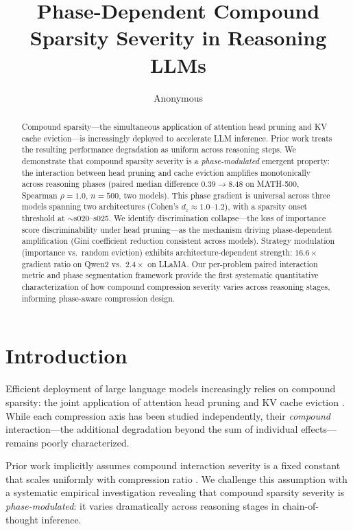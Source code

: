 \documentclass[11pt,a4paper]{article}
\title{Phase-Dependent Compound Sparsity Severity in Reasoning LLMs}
\author{Anonymous}
\begin{document}
\maketitle

\begin{abstract}
Compound sparsity---the simultaneous application of attention head pruning and KV cache eviction---is increasingly deployed to accelerate LLM inference. Prior work treats the resulting performance degradation as uniform across reasoning steps. We demonstrate that compound sparsity severity is a \emph{phase-modulated} emergent property: the interaction between head pruning and cache eviction amplifies monotonically across reasoning phases (paired median difference $0.39 \rightarrow 8.48$ on MATH-500, Spearman $\rho = 1.0$, $n = 500$, two models). This phase gradient is universal across three models spanning two architectures (Cohen's $d_z \approx 1.0$--$1.2$), with a sparsity onset threshold at $\sim$s020--s025. We identify discrimination collapse---the loss of importance score discriminability under head pruning---as the mechanism driving phase-dependent amplification (Gini coefficient reduction consistent across models). Strategy modulation (importance vs.\ random eviction) exhibits architecture-dependent strength: $16.6\times$ gradient ratio on Qwen2 vs.\ $2.4\times$ on LLaMA. Our per-problem paired interaction metric and phase segmentation framework provide the first systematic quantitative characterization of how compound compression severity varies across reasoning stages, informing phase-aware compression design.
\end{abstract}

\section{Introduction}

Efficient deployment of large language models increasingly relies on compound sparsity: the joint application of attention head pruning and KV cache eviction \cite{spark2024,adakv2024}. While each compression axis has been studied independently, their \emph{compound} interaction---the additional degradation beyond the sum of individual effects---remains poorly characterized.

Prior work implicitly assumes compound interaction severity is a fixed constant that scales uniformly with compression ratio \cite{spark2024}. We challenge this assumption with a systematic empirical investigation revealing that compound sparsity severity is \emph{phase-modulated}: it varies dramatically across reasoning stages in chain-of-thought inference.
\end{document}
